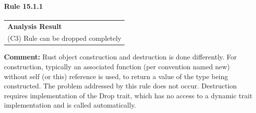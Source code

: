 \paragraph{Rule 15.1.1}
\begin{longtable}{p{13cm}}
\textbf{Analysis Result} \\
(C3) Rule can be dropped completely \\
\end{longtable}
\textbf{Comment:} Rust object construction and destruction is done differently. For construction, typically an associated function (per convention named new) without self (or this) reference is used, to return a value of the type being constructed. The problem addressed by this rule does not occur. Destruction requires implementation of the Drop trait, which has no access to a dynamic trait implementation and is called automatically. \\



